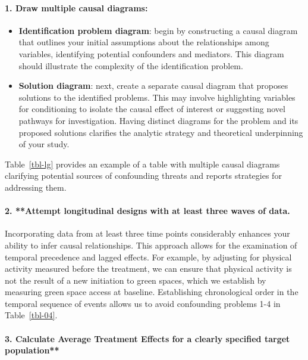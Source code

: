 \documentclass[
  singlecolumn]{article}
\let\oldparagraph\paragraph
\renewcommand{\paragraph}[1]{\oldparagraph{#1}\mbox{}}
\providecommand{\tightlist}{%
  \setlength{\itemsep}{0pt}\setlength{\parskip}{0pt}}\usepackage{longtable,booktabs,array}
\begin{document}
\paragraph{\texorpdfstring{1. \textbf{Draw multiple causal
diagrams}:}{1. Draw multiple causal diagrams:}}\label{draw-multiple-causal-diagrams-1}

\begin{itemize}
\tightlist
\item
  \textbf{Identification problem diagram}: begin by constructing a
  causal diagram that outlines your initial assumptions about the
  relationships among variables, identifying potential confounders and
  mediators. This diagram should illustrate the complexity of the
  identification problem.
\item
  \textbf{Solution diagram}: next, create a separate causal diagram that
  proposes solutions to the identified problems. This may involve
  highlighting variables for conditioning to isolate the causal effect
  of interest or suggesting novel pathways for investigation. Having
  distinct diagrams for the problem and its proposed solutions clarifies
  the analytic strategy and theoretical underpinning of your study.
\end{itemize}

Table~\ref{tbl-lg} provides an example of a table with multiple causal
diagrams clarifying potential sources of confounding threats and reports
strategies for addressing them.

\paragraph{2. **Attempt longitudinal designs with at least three waves
of
data.}\label{attempt-longitudinal-designs-with-at-least-three-waves-of-data.}

Incorporating data from at least three time points considerably enhances
your ability to infer causal relationships. This approach allows for the
examination of temporal precedence and lagged effects. For example, by
adjusting for physical activity measured before the treatment, we can
ensure that physical activity is not the result of a new initiation to
green spaces, which we establish by measuring green space access at
baseline. Establishing chronological order in the temporal sequence of
events allows us to avoid confounding problems 1-4 in
Table~\ref{tbl-04}.

\paragraph{3. Calculate Average Treatment Effects for a clearly
specified target
population**}\label{calculate-average-treatment-effects-for-a-clearly-specified-target-population}
\end{document}
